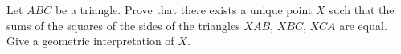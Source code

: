 Let $ABC$ be a triangle. Prove that there exists a unique point $X$ such that the sums of the squares of the sides of the triangles $XAB$, $XBC$, $XCA$ are equal. Give a geometric interpretation of $X$.
